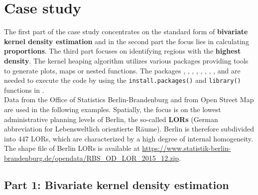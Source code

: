 \hypertarget{Case-study}{%
\section{Case study}\label{Case-study}}

The first part of the case study concentrates on the standard form of \textbf{bivariate kernel density estimation} and in the second part the focus lies in calculating \textbf{proportions}. 
The third part focuses on identifying regions with the \textbf{highest density}.  
The kernel heaping algorithm utilizes various packages providing tools to generate plots, maps or nested functions. The packages 
\hyperlink{https://cran.r-project.org/web/packages/fields/index.html}{},
\hyperlink{https://cran.r-project.org/web/packages/ggplot2/index.html}{},
\hyperlink{https://cran.r-project.org/web/packages/RColorBrewer/index.html}{},
\hyperlink{https://cran.r-project.org/web/packages/dplyr/index.html}{}, 
\hyperlink{https://cran.r-project.org/web/packages/terra/index.html}{},
\hyperlink{https://cran.r-project.org/web/packages/sp/index.html}{},
\hyperlink{https://cran.r-project.org/web/packages/sf/index.html}{},
\hyperlink{https://cran.r-project.org/web/packages/patchwork/index.html}{},
\hyperlink{https://cran.r-project.org/web/packages/rmapshaper/index.html}{}
and 
\hyperlink{https://cran.r-project.org/web/packages/Kernelheaping/index.html}{} are needed to execute the code by using the 
\texttt{install.packages()} and \texttt{library()} functions in . 
\\


Data from the Office of Statistics Berlin-Brandenburg and from Open Street Map are used in the following examples. Spatially, the focus is on the lowest administrative planning levels of Berlin, the so-called \textbf{LORs} (German abbreviation for Lebensweltlich orientierte Räume). Berlin is therefore subdivided into 447 LORs, which are characterized by a high degree of internal homogeneity. The shape file of Berlin LORs is available at \url{https://www.statistik-berlin-brandenburg.de/opendata/RBS_OD_LOR_2015_12.zip}.

\hypertarget{Part-1-Bivariate-kernel-density-estimation}{%
\subsection{Part 1: Bivariate kernel density estimation}\label{Part-1-Bivariate-kernel-density-estimation}}



